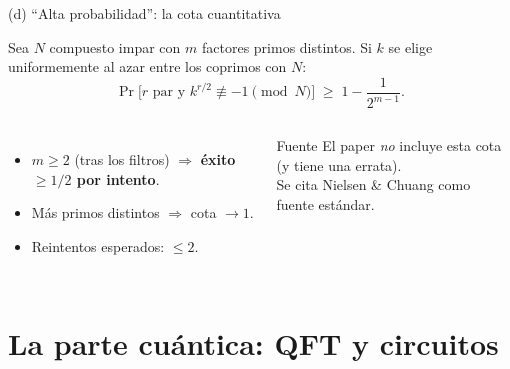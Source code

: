\documentclass[aspectratio=169]{beamer}
\begin{document}
\begin{frame}{(d) ``Alta probabilidad'': la cota cuantitativa}
  \begin{theorem}
    Sea $N$ compuesto impar con $m$ factores primos distintos. Si $k$ se elige
    uniformemente al azar entre los coprimos con $N$:
    \[
      \Pr\!\bigl[r\text{ par y }k^{r/2}\not\equiv -1\pmod{N}\bigr]
      \;\geq\;
      1 - \frac{1}{2^{m-1}}.
    \]
  \end{theorem}

  \begin{columns}[T]
    \begin{itemize}
      \item $m\geq 2$ (tras los filtros) $\Rightarrow$
            \textbf{éxito $\geq 1/2$ por intento}.
      \item Más primos distintos $\Rightarrow$ cota $\to 1$.
      \item Reintentos esperados: $\leq 2$.
    \end{itemize}

    \begin{exampleblock}{\small Fuente}
      \small El paper \emph{no} incluye esta cota
      (y tiene una errata).\\
      Se cita Nielsen \& Chuang como fuente estándar.
    \end{exampleblock}
  \end{columns}

\end{frame}

\section{La parte cuántica: QFT y circuitos}
\end{document}
